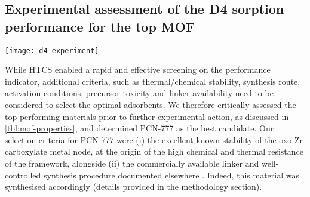 \subsection{Experimental assessment of the D4 sorption performance for the top MOF}\label{assessment}

\begin{widefigure}[htb]
    \centering
    \texttt{[image: d4-experiment]}
    \caption{%
        (a) Single component adsorption/desorption isotherms for D4 (blue) and
         (red) collected at \SI{303}{\kelvin} for PCN-777 in the
        pressure range of 0-\SI{10}{\pascal} (corresponding to 0--0.05
        p/p\textsuperscript{0} for D4). Solid and open symbols represent
        adsorption and desorption branches, respectively. (b) Comparison of the
        D4 capacity of MOFs investigated in the present study with other classes
        of porous materials (data from
        \citet{wangRecentAdvancesTechnologies2019}), with error bars placed at
        one standard deviation of mean capacity. (c) 5 D4 sorption-desorption
        cycles recorded after the first two isotherms on PCN-777, in the same
        pressure range. (d) PXRD of pristine PCN-777 sample (black) and samples
        recovered after D4 cycling (blue) and water adsorption (red).
    }\label{fig:d4-experiment}
\end{widefigure}

While HTCS enabled a rapid and effective screening on the performance indicator,
additional criteria, such as thermal/chemical stability, synthesis route,
activation conditions, precursor toxicity and linker availability need to be
considered to select the optimal adsorbents. We therefore critically assessed
the top performing materials prior to further experimental action, as discussed
in \cref{tbl:mof-properties}, and determined PCN-777 as the best candidate. Our
selection criteria for PCN-777 were (i) the excellent known stability of the
oxo-Zr-carboxylate metal node, at the origin of the high chemical and thermal
resistance of the framework, alongside (ii) the commercially available
linker and well-controlled synthesis procedure documented elsewhere
\citep{fengHighlyStableZeotype2015, liuPhotocatalyticHydrogenProduction2018}.
Indeed, this material was synthesised accordingly (details provided in the
methodology section).


